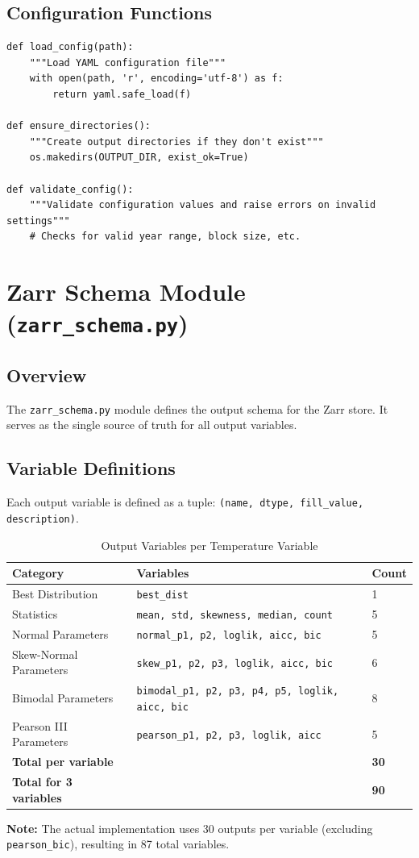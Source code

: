 ﻿\documentclass[12pt,a4paper]{report}
\begin{document}
\subsection{Configuration Functions}
\begin{lstlisting}[caption=Configuration Functions]
def load_config(path):
    """Load YAML configuration file"""
    with open(path, 'r', encoding='utf-8') as f:
        return yaml.safe_load(f)

def ensure_directories():
    """Create output directories if they don't exist"""
    os.makedirs(OUTPUT_DIR, exist_ok=True)

def validate_config():
    """Validate configuration values and raise errors on invalid settings"""
    # Checks for valid year range, block size, etc.
\end{lstlisting}

\section{Zarr Schema Module (\texttt{zarr\_schema.py})}
\subsection{Overview}
The \texttt{zarr\_schema.py} module defines the output schema for the Zarr store. It serves as the single source of truth for all output variables.

\subsection{Variable Definitions}
Each output variable is defined as a tuple: \texttt{(name, dtype, fill\_value, description)}.
\begin{table}[H]
    \centering
    \caption{Output Variables per Temperature Variable}
    \begin{tabular}{l l l}
        \toprule
        \textbf{Category} & \textbf{Variables} & \textbf{Count} \\
        \midrule
        Best Distribution & \texttt{best\_dist} & 1 \\
        Statistics & \texttt{mean, std, skewness, median, count} & 5 \\
        Normal Parameters & \texttt{normal\_p1, p2, loglik, aicc, bic} & 5 \\
        Skew-Normal Parameters & \texttt{skew\_p1, p2, p3, loglik, aicc, bic} & 6 \\
        Bimodal Parameters & \texttt{bimodal\_p1, p2, p3, p4, p5, loglik, aicc, bic} & 8 \\
        Pearson III Parameters & \texttt{pearson\_p1, p2, p3, loglik, aicc} & 5 \\
        \midrule
        \textbf{Total per variable} & & \textbf{30} \\
        \textbf{Total for 3 variables} & & \textbf{90} \\
        \bottomrule
    \end{tabular}
\end{table}
\textbf{Note:} The actual implementation uses 30 outputs per variable (excluding \texttt{pearson\_bic}), resulting in 87 total variables.
\end{document}
